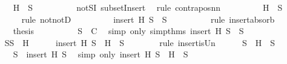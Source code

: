 \begin{isabellebody}
\ \ \ \ \ \ \isamarkupfalse%
\ {\isachardoublequoteopen}{\isasymnot}{\isacharparenleft}H\ {\isasymnotin}\ S{}{\isacharparenright}{\isachardoublequoteclose}\isanewline
\ \ \ \ \ \ \ \ \isamarkupfalse%
\ notSI\ subsetInsert\ \isamarkupfalse%
\ {\isacharparenleft}rule\ contrapos{\isacharunderscore}nn{\isacharparenright}\isanewline
\ \ \ \ \ \ \isamarkupfalse%
\ \isamarkupfalse%
\ {\isachardoublequoteopen}H\ {\isasymin}\ S{}{\isachardoublequoteclose}\isanewline
\ \ \ \ \ \ \ \ \isamarkupfalse%
\ {\isacharparenleft}rule\ notnotD{\isacharparenright}\isanewline
\ \ \ \ \ \ \isamarkupfalse%
\ \isamarkupfalse%
\ {\isachardoublequoteopen}insert\ H\ S{}\ {\isacharequal}\ S{}{\isachardoublequoteclose}\isanewline
\ \ \ \ \ \ \ \ \isamarkupfalse%
\ {\isacharparenleft}rule\ insert{\isacharunderscore}absorb{\isacharparenright}\isanewline
\ \ \ \ \ \ \isamarkupfalse%
\ {\isacharquery}thesis\isanewline
\ \ \ \ \ \ \ \ \isamarkupfalse%
\ {\isacartoucheopen}S{}\ {\isasymnotin}\ C{\isacartoucheclose}\ \isamarkupfalse%
\ {\isacharparenleft}simp\ only{\isacharcolon}\ simp{\isacharunderscore}thms{\isacharparenleft}{}{\isacharparenright}\ {\isacartoucheopen}insert\ H\ S{}\ {\isacharequal}\ S{}{\isacartoucheclose}{\isacharparenright}\isanewline
\ \ \ \ \isamarkupfalse%
\ \isanewline
\ \ \ \ \isamarkupfalse%
\ {\isacharquery}S{}{\isacharequal}{\isachardoublequoteopen}S{}\ {\isacharminus}\ {\isacharbraceleft}H{\isacharbraceright}{\isachardoublequoteclose}\isanewline
\ \ \ \ \isamarkupfalse%
\ {\isachardoublequoteopen}insert\ H\ S\ {\isacharequal}\ {\isacharbraceleft}H{\isacharbraceright}\ {\isasymunion}\ S{\isachardoublequoteclose}\isanewline
\ \ \ \ \ \ \isamarkupfalse%
\ {\isacharparenleft}rule\ insert{\isacharunderscore}is{\isacharunderscore}Un{\isacharparenright}\isanewline
\ \ \ \ \isamarkupfalse%
\ {\isachardoublequoteopen}S{}\ {\isasymsubseteq}\ {\isacharbraceleft}H{\isacharbraceright}\ {\isasymunion}\ S{\isachardoublequoteclose}\isanewline
\ \ \ \ \ \ \isamarkupfalse%
\ {\isacartoucheopen}S{}\ {\isasymsubseteq}\ insert\ H\ S{\isacartoucheclose}\ \isamarkupfalse%
\ {\isacharparenleft}simp\ only{\isacharcolon}\ {\isacartoucheopen}insert\ H\ S\ {\isacharequal}\ {\isacharbraceleft}H{\isacharbraceright}\ {\isasymunion}\ S{\isacartoucheclose}{\isacharparenright}\isanewline

\end{isabellebody}
